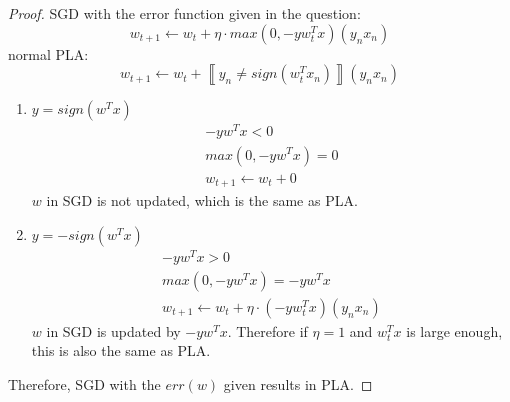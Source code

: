 \documentclass[12pt,a4paper]{article}
\theoremstyle{remark}
\begin{document}
\section{} %
\begin{proof}
	SGD with the error function given in the question:
	\[
		w_{t+1} \leftarrow w_{t} + \eta \cdot max(0, -yw_{t}^{T}x) (y_{n}x_{n})
	\]
	normal PLA:
	\[
		w_{t+1} \leftarrow w_{t} + \left\llbracket y_{n} \neq sign(w_{t}^{T}x_{n}) \right\rrbracket (y_{n}x_{n})
	\]
	\begin{enumerate}[{Case} 1{:}]
		\item $y = sign(w^{T}x)$
		\[
			\begin{gathered}
				-yw^{T}x < 0 \\
				max(0, -yw^{T}x) = 0 \\
				w_{t+1} \leftarrow w_{t} + 0
			\end{gathered}
		\]
		$w$ in SGD is not updated, which is the same as PLA.
		\item $y = -sign(w^{T}x)$
		\[
			\begin{gathered}
				-yw^{T}x > 0 \\
				max(0, -yw^{T}x) = -yw^{T}x \\
				w_{t+1} \leftarrow w_{t} + \eta \cdot (-yw_{t}^{T}x) (y_{n}x_{n})
			\end{gathered}
		\]
		$w$ in SGD is updated by $-yw^{T}x$. Therefore if $\eta = 1$ and $w_{t}^{T}x$ is large enough, this is also the same as PLA.
	\end{enumerate}
	Therefore, SGD with the $err(w)$ given results in PLA.
\end{proof}
\end{document}
